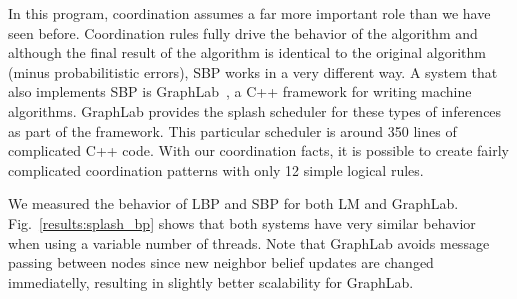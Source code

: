\begin{dblfig}
   \begin{center}
   \end{center}
\end{dblfig}


In this program, coordination assumes a far more important role than we have
seen before. Coordination rules fully drive the behavior of the algorithm and
although the final result of the algorithm is identical to the original
algorithm (minus probabilitistic errors), SBP works in a very different way.
A system that also implements SBP is
GraphLab~\cite{GraphLab2010}, a C++ framework for writing machine algorithms.
GraphLab provides the splash scheduler for these types of inferences as part of
the framework. This particular scheduler is around 350 lines of complicated C++ code.
With our coordination facts, it is possible to create fairly complicated coordination
patterns with only 12 simple logical rules.

We measured the behavior of LBP and SBP for both LM and GraphLab.
Fig.~\ref{results:splash_bp} shows that both systems have very similar behavior
when using a variable number of threads.
Note that GraphLab avoids message passing between nodes since new neighbor
belief updates are changed immediatelly, resulting in slightly better
scalability for GraphLab.


